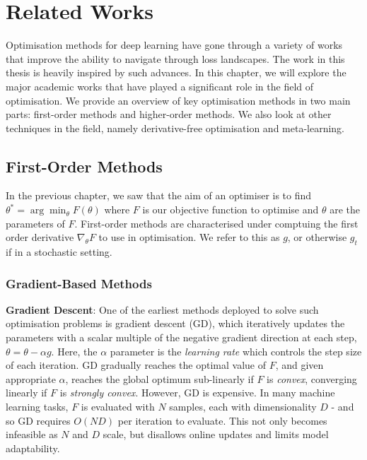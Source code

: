\chapter{Related Works}
\label{chap:lit_review}


Optimisation methods for deep learning have gone through a variety of works that improve the ability to navigate through loss landscapes.
The work in this thesis is heavily inspired by such advances. In this chapter, we will explore the major academic works that have played a significant role in the field of optimisation. We provide an overview of key optimisation methods in two main parts: first-order methods and higher-order methods. We also look at other techniques in the field, namely derivative-free optimisation and meta-learning.

\section{First-Order Methods}
In the previous chapter, we saw that the aim of an optimiser is to find $\theta^* = \arg\min_{\theta} F(\theta)$ where $F$ is our objective function to optimise and $\theta$ are the parameters of $F$. First-order methods are characterised under comptuing the first order derivative $\nabla_{\theta}F$ to use in optimisation. We refer to this as $g$, or otherwise $g_t$ if in a stochastic setting.

\subsection{Gradient-Based Methods}
\textbf{Gradient Descent}: One of the earliest methods deployed to solve such optimisation problems is gradient descent (GD), which iteratively updates the parameters with a scalar multiple of the negative gradient direction at each step, $\theta = \theta - \alpha g$. Here, the $\alpha$ parameter is the \textit{learning rate} which controls the step size of each iteration. GD gradually reaches the optimal value of $F$, and given appropriate $\alpha$, reaches the global optimum sub-linearly if $F$ is \textit{convex}, converging linearly if $F$ is \textit{strongly convex}. However, GD is expensive. In many machine learning tasks, $F$ is evaluated with $N$ samples, each with dimensionality $D$ - and so GD requires $O(ND)$ per iteration to evaluate. This not only becomes infeasible as $N$ and $D$ scale, but disallows online updates and limits model adaptability.

